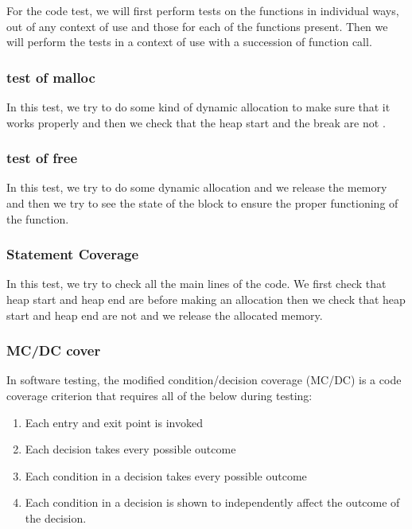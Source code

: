 

For the code test, we will first perform tests on the functions in individual ways, out of any context of use and those for each of the functions present.
Then we will perform the tests in a context of use with a succession of function call.
\subsubsection{test of malloc}
In this test, we try to do some kind of dynamic allocation to make sure that it works properly and then we check that the heap start and the break are not .

\subsubsection{test of free}
In this test, we try to do some dynamic allocation and we release the memory and then we try to see the state of the block to ensure the proper functioning of the function.

\subsubsection{Statement Coverage}
In this test, we try to check all the main lines of the code. We first check that heap start and heap end are  before making an allocation then we check that heap start and heap end are not  and we release the allocated memory.
\subsubsection{MC/DC cover}
In software testing, the modified condition/decision coverage (MC/DC) is a code coverage criterion that requires all of the below during testing:

 \begin{enumerate}
\item Each entry and exit point is invoked
\item Each decision takes every possible outcome
\item Each condition in a decision takes every possible outcome
\item Each condition in a decision is shown to independently affect the outcome of the decision.
\end{enumerate}

